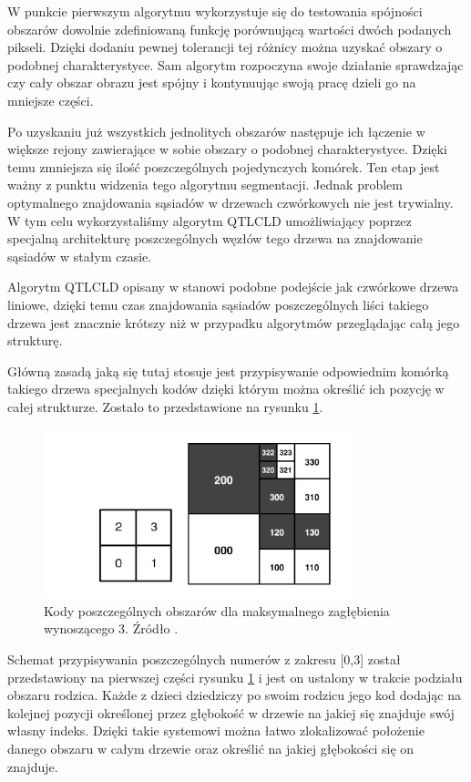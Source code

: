 \documentclass{classrep}
\begin{document}
W punkcie pierwszym algorytmu wykorzystuje się do testowania spójności obszarów dowolnie zdefiniowaną funkcję porównującą wartości dwóch podanych pikseli. Dzięki dodaniu pewnej tolerancji tej różnicy można uzyskać obszary o podobnej charakterystyce. Sam algorytm rozpoczyna swoje działanie sprawdzając czy cały obszar obrazu jest spójny i kontynuując swoją pracę dzieli go na mniejsze części.

Po uzyskaniu już wszystkich jednolitych obszarów następuje ich łączenie w większe rejony zawierające w sobie obszary o podobnej charakterystyce. Dzięki temu zmniejsza się ilość poszczególnych pojedynczych komórek. Ten etap jest ważny z punktu widzenia tego algorytmu segmentacji. Jednak problem optymalnego znajdowania sąsiadów w drzewach czwórkowych nie jest trywialny. W tym celu wykorzystaliśmy algorytm QTLCLD \cite{3} umożliwiający poprzez specjalną architekturę poszczególnych węzłów tego drzewa na znajdowanie sąsiadów w stałym czasie.

Algorytm QTLCLD opisany w \cite{3} stanowi podobne podejście jak czwórkowe drzewa liniowe, dzięki temu czas znajdowania sąsiadów poszczególnych liści takiego drzewa jest znacznie krótszy niż w przypadku algorytmów przeglądając całą jego strukturę. 

Główną zasadą jaką się tutaj stosuje jest przypisywanie odpowiednim komórką takiego drzewa specjalnych kodów dzięki którym można określić ich pozycję w całej strukturze. Zostało to przedstawione na rysunku \ref{fig_seg_kody}.

\begin{figure}[H]
  \centering
  \includegraphics[width=0.8\textwidth]{img/seg/kody}
  \caption{Kody poszczególnych obszarów dla maksymalnego zagłębienia wynoszącego 3. Źródło \cite{3}.}
  \label{fig_seg_kody}
\end{figure}

Schemat przypisywania poszczególnych numerów z zakresu [0,3] został przedstawiony na pierwszej części rysunku \ref{fig_seg_kody} i jest on ustalony w trakcie podziału obszaru rodzica. Każde z dzieci dziedziczy po swoim rodzicu jego kod dodając na kolejnej pozycji określonej przez głębokość w drzewie na jakiej się znajduje swój własny indeks. Dzięki takie systemowi można łatwo zlokalizować położenie danego obszaru w całym drzewie oraz określić na jakiej głębokości się on znajduje. 
\end{document}

